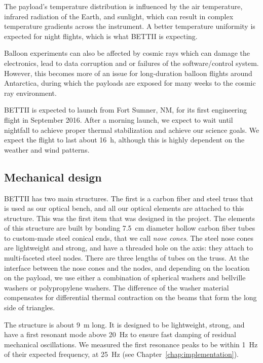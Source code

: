 The payload's temperature distribution is influenced by the air temperature, infrared radiation of the Earth, and sunlight, which can result in complex temperature gradients across the instrument. A better temperature uniformity is expected for night flights, which is what BETTII is expecting.

Balloon experiments can also be affected by cosmic rays which can damage the electronics, lead to data corruption and or failures of the software/control system. However, this becomes more of an issue for long-duration balloon flights around Antarctica, during which the payloads are exposed for many weeks to the cosmic ray environment.

BETTII is expected to launch from Fort Sumner, NM, for its first engineering flight in September 2016. After a morning launch, we expect to wait until nightfall to achieve proper thermal stabilization and achieve our science goals. We expect the flight to last about \SI{16}{\hour}, although this is highly dependent on the weather and wind patterns.


\subsection{Mechanical design}

BETTII has two main structures. The first is a carbon fiber and steel truss that is used as our optical bench, and all our optical elements are attached to this structure. This was the first item that was designed in the project. The elements of this structure are built by bonding \SI{7.5}{\centi\meter} diameter hollow carbon fiber tubes to custom-made steel conical ends, that we call \textit{nose cones}. The steel nose cones are lightweight and strong, and have a threaded hole on the axis: they attach to multi-faceted steel nodes. There are three lengths of tubes on the truss. At the interface between the nose cones and the nodes, and depending on the location on the payload, we use either a combination of spherical washers and bellville washers or polypropylene washers. The difference of the washer material compensates for differential thermal contraction on the beams that form the long side of triangles.

The structure is about \SI{9}{\meter} long. It is designed to be lightweight, strong, and have a first resonant mode above \SI{20}{\hertz} to ensure fast damping of residual mechanical oscillations. We measured the first resonance peaks to be within \SI{1}{\hertz} of their expected frequency, at \SI{25}{\hertz} (see Chapter~\ref{chap:implementation}).

